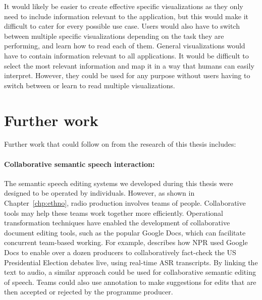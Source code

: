 



It would likely be easier to create effective specific visualizations as they
only need to include information relevant to the application, but this would make it difficult to cater for every
possible use case. Users would also have to switch between multiple specific visualizations depending on the task they
are performing, and learn how to read each of them. General visualizations would have to contain information relevant
to all applications. It would be difficult to select the most relevant information and map it in a way that humans can
easily interpret. However, they could be used for any purpose without users having to switch between or learn to read
multiple visualizations.






\section{Further work}

Further work that could follow on from the research of this thesis includes:

\paragraph{Collaborative semantic speech interaction:}

The semantic speech editing systems we developed during this thesis were designed to be operated by individuals.
However, as shown in Chapter~\ref{chp:ethno}, radio production involves teams of people.  Collaborative tools may help
these teams work together more efficiently.  Operational transformation techniques \citep{Sun2004} have enabled the
development of collaborative document editing tools, such as the popular Google Docs, which can facilitate concurrent
team-based working.  For example, \citet{Fisher2016} describes how NPR used Google Docs to enable over a dozen
producers to collaboratively fact-check the US Presidential Election debates live, using real-time ASR transcripts. By
linking the text to audio, a similar approach could be used for collaborative semantic editing of speech. Teams could
also use annotation to make suggestions for edits that are then accepted or rejected by the programme producer.

